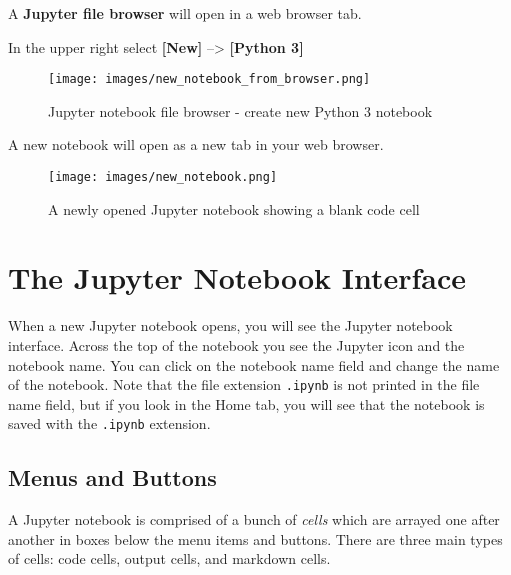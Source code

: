 \documentclass{book}
\makeatletter
\def\maxwidth{\ifdim\Gin@nat@width>\linewidth\linewidth
\else\Gin@nat@width\fi}
\let\Oldincludegraphics\includegraphics
\renewcommand{\includegraphics}[1]{\Oldincludegraphics[width=.8\maxwidth]{#1}}
\newcommand{\passthrough}[1]{#1}
\makeatother
\begin{document}
A \textbf{Jupyter file browser} will open in a web browser tab.

In the upper right select \textbf{{[}New{]}} --\textgreater{}
\textbf{{[}Python 3{]}}

\begin{figure}
\centering
\texttt{[image: images/new\_notebook\_from\_browser.png]}
\caption{Jupyter notebook file browser - create new Python 3 notebook}
\end{figure}

A new notebook will open as a new tab in your web browser.

\begin{figure}
\centering
\texttt{[image: images/new\_notebook.png]}
\caption{A newly opened Jupyter notebook showing a blank code cell}
\end{figure}
    




    
        \hypertarget{the-jupyter-notebook-interface}{%
\section{The Jupyter Notebook
Interface}\label{the-jupyter-notebook-interface}}
    




    
        When a new Jupyter notebook opens, you will see the Jupyter notebook
interface. Across the top of the notebook you see the Jupyter icon and
the notebook name. You can click on the notebook name field and change
the name of the notebook. Note that the file extension
\passthrough{\lstinline!.ipynb!} is not printed in the file name field,
but if you look in the Home tab, you will see that the notebook is saved
with the \passthrough{\lstinline!.ipynb!} extension.
    




    
        \hypertarget{menus-and-buttons}{%
\subsection{Menus and Buttons}\label{menus-and-buttons}}

A Jupyter notebook is comprised of a bunch of \emph{cells} which are
arrayed one after another in boxes below the menu items and buttons.
There are three main types of cells: code cells, output cells, and
markdown cells.
    
\end{document}
